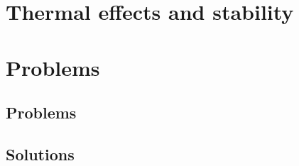    \chapter{Thermal effects and stability}
      
      

   

   \chapter{Problems}
      \section{Problems}
         
         
         
         
         
         
         
         
         
         
         
         
      \section{Solutions}
         \shipoutAnswer


